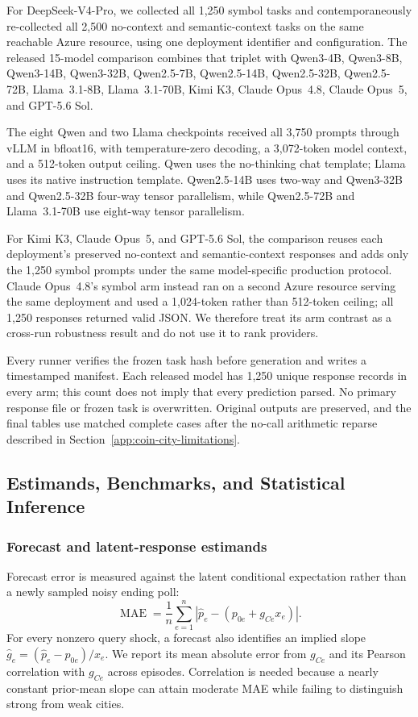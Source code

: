 For DeepSeek-V4-Pro, we collected all 1,250 symbol tasks and contemporaneously
re-collected all 2,500 no-context and semantic-context tasks on the same reachable
Azure resource, using one deployment identifier and configuration. The released
15-model comparison combines that triplet with Qwen3-4B, Qwen3-8B,
Qwen3-14B, Qwen3-32B, Qwen2.5-7B, Qwen2.5-14B, Qwen2.5-32B, Qwen2.5-72B,
Llama~3.1-8B, Llama~3.1-70B, Kimi K3, Claude Opus~4.8, Claude Opus~5, and
GPT-5.6 Sol.

The eight Qwen and two Llama checkpoints received all 3,750 prompts through vLLM
in bfloat16, with temperature-zero decoding, a 3,072-token model context, and a
512-token output ceiling. Qwen uses the no-thinking chat template; Llama uses its
native instruction template. Qwen2.5-14B uses two-way and Qwen3-32B and
Qwen2.5-32B four-way tensor parallelism, while Qwen2.5-72B and Llama~3.1-70B use
eight-way tensor parallelism.

For Kimi K3, Claude Opus~5, and GPT-5.6 Sol, the comparison reuses each
deployment's preserved no-context and semantic-context responses and adds only
the 1,250 symbol prompts under the same model-specific production protocol.
Claude Opus~4.8's symbol arm instead ran on a second Azure resource serving the
same deployment and used a 1,024-token rather than 512-token ceiling; all 1,250
responses returned valid JSON. We therefore treat its arm contrast as a
cross-run robustness result and do not use it to rank providers.

Every runner verifies the frozen task hash before generation and writes a
timestamped manifest. Each released model has 1,250 unique response records in
every arm; this count does not imply that every prediction parsed. No primary
response file or frozen task is overwritten. Original outputs are preserved, and
the final tables use matched complete cases after the no-call arithmetic reparse
described in Section~\ref{app:coin-city-limitations}.

\subsection{Estimands, Benchmarks, and Statistical Inference}
\label{app:coin-city-analysis}

\subsubsection{Forecast and latent-response estimands}
Forecast error is measured against the latent conditional expectation rather than
a newly sampled noisy ending poll:
\[
  \operatorname{MAE}
  =\frac{1}{n}\sum_{e=1}^{n}
    \left|\widehat p_e-(p_{0e}+g_{Ce}x_e)\right|.
\]
For every nonzero query shock, a forecast also identifies an implied slope
\(\widehat g_e=(\widehat p_e-p_{0e})/x_e\). We report its mean absolute error from
\(g_{Ce}\) and its Pearson correlation with \(g_{Ce}\) across episodes.
Correlation is needed because a nearly constant prior-mean slope can attain
moderate MAE while failing to distinguish strong from weak cities.


